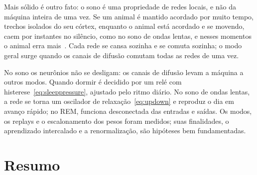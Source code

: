 Mais sólido é outro fato: o sono é uma propriedade de redes locais, e não da máquina inteira de uma vez. Se um animal é mantido acordado por muito tempo, trechos isolados do seu córtex, enquanto o animal está acordado e se movendo, caem por instantes no silêncio, como no sono de ondas lentas, e nesses momentos o animal erra mais~\cite{Vyazovskiy2011}. Cada rede se cansa sozinha e se comuta sozinha; o modo geral surge quando os canais de difusão comutam todas as redes de uma vez.

\begin{keyblock}
\begin{proposition}
\label{prop:sleep}
No sono os neurônios não se desligam: os canais de difusão levam a máquina a outros modos. Quando dormir é decidido por um relé com histerese~\eqref{eq:sleeppressure}, ajustado pelo ritmo diário. No sono de ondas lentas, a rede se torna um oscilador de relaxação~\eqref{eq:updown} e reproduz o dia em avanço rápido; no REM, funciona desconectada das entradas e saídas. Os modos, os replays e o escalonamento dos pesos foram medidos; suas finalidades, o aprendizado intercalado e a renormalização, são hipóteses bem fundamentadas.
\end{proposition}
\end{keyblock}

\section{Resumo}

